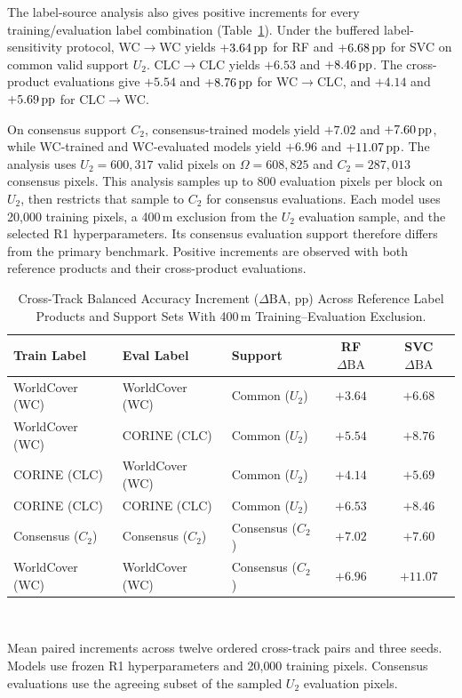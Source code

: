 The label-source analysis also gives positive increments for every training/evaluation label combination (Table~\ref{tab:label_independence_controls}). Under the buffered label-sensitivity protocol, WC$\to$WC yields $+3.64\,\mathrm{pp}$ for RF and $+6.68\,\mathrm{pp}$ for SVC on common valid support $U_2$. CLC$\to$CLC yields $+6.53$ and $+8.46\,\mathrm{pp}$. The cross-product evaluations give $+5.54$ and $+8.76\,\mathrm{pp}$ for WC$\to$CLC, and $+4.14$ and $+5.69\,\mathrm{pp}$ for CLC$\to$WC.

On consensus support $C_2$, consensus-trained models yield $+7.02$ and $+7.60\,\mathrm{pp}$, while WC-trained and WC-evaluated models yield $+6.96$ and $+11.07\,\mathrm{pp}$. The analysis uses $U_2=600{,}317$ valid pixels on $\Omega=608{,}825$ and $C_2=287{,}013$ consensus pixels. This analysis samples up to 800 evaluation pixels per block on $U_2$, then restricts that sample to $C_2$ for consensus evaluations. Each model uses 20{,}000 training pixels, a 400\,m exclusion from the $U_2$ evaluation sample, and the selected R1 hyperparameters. Its consensus evaluation support therefore differs from the primary benchmark. Positive increments are observed with both reference products and their cross-product evaluations.

\begin{table}[!t]
\caption{Cross-Track Balanced Accuracy Increment ($\Delta\text{BA}$, pp) Across Reference Label Products and Support Sets With 400\,m Training--Evaluation Exclusion.}
\label{tab:label_independence_controls}
\centering
\scriptsize
\setlength{\tabcolsep}{1.8pt}
\begin{tabular}{lllcc}
\toprule
Train Label & Eval Label & Support & RF $\Delta\text{BA}$ & SVC $\Delta\text{BA}$ \\
\midrule
WorldCover (WC) & WorldCover (WC) & Common ($U_2$) & $+3.64$ & $+6.68$ \\
WorldCover (WC) & CORINE (CLC)    & Common ($U_2$) & $+5.54$ & $+8.76$ \\
CORINE (CLC)    & WorldCover (WC) & Common ($U_2$) & $+4.14$ & $+5.69$ \\
CORINE (CLC)    & CORINE (CLC)    & Common ($U_2$) & $+6.53$ & $+8.46$ \\
Consensus ($C_2$) & Consensus ($C_2$) & Consensus ($C_2$) & $+7.02$ & $+7.60$ \\
WorldCover (WC) & WorldCover (WC) & Consensus ($C_2$) & $+6.96$ & $+11.07$ \\
\bottomrule
\end{tabular}
\\[2pt]
\parbox{\columnwidth}{\footnotesize Mean paired increments across twelve ordered cross-track pairs and three seeds. Models use frozen R1 hyperparameters and 20{,}000 training pixels. Consensus evaluations use the agreeing subset of the sampled $U_2$ evaluation pixels.}
\end{table}

